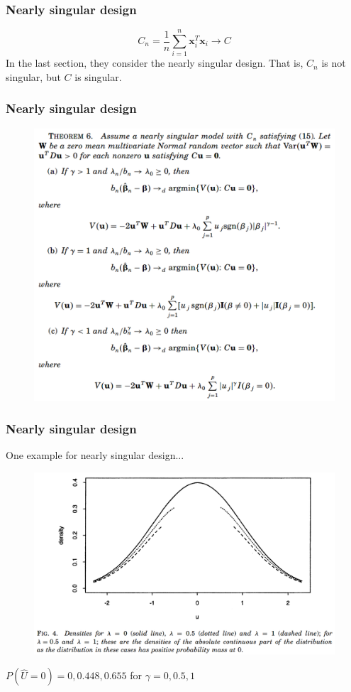 \documentclass{beamer}
\begin{document}
	\begin{frame}
		\frametitle{Nearly singular design}
		$$C_n = \frac{1}{n}\sum_{i=1}^{n}\bm{x}_i^T\bm{x}_i \to C$$
		In the last section, they consider the nearly singular design. That is, $C_n$ is not singular, but $C$ is singular.
	\end{frame}
	
	
	\begin{frame}
		\frametitle{Nearly singular design}
		\begin{figure}
			\includegraphics[width=.7\linewidth]{image015.png}
		\end{figure}
	\end{frame}
	
	\begin{frame}
		\frametitle{Nearly singular design}
		One example for nearly singular design...
		\begin{figure}
			\includegraphics[width=.8\linewidth]{image016.png}
		\end{figure}
		$P(\hat{U} = 0) = 0, 0.448, 0.655$ for $\gamma = 0, 0.5, 1$
	\end{frame}
	
	
	
	
\end{document}

